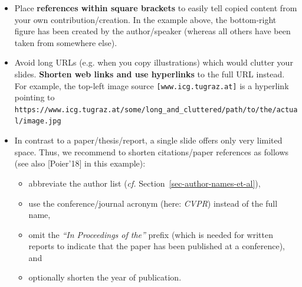 \documentclass[11pt,a4paper]{article}
\begin{document}
\begin{goodexample}
  \label{ex-slide1}
  \begin{figure}[H]
    \centering%
    {%
      \setlength{\fboxsep}{0pt}%
      \setlength{\fboxrule}{2pt}%
    }
  \end{figure}
  
  \begin{itemize}[leftmargin=6pt]
    \item Place \textbf{references within square brackets} to easily tell copied content from your own contribution/creation. In the example above, the bottom-right figure has been created by the author/speaker (whereas all others have been taken from somewhere else).
    \item Avoid long URLs (e.g. when you copy illustrations) which would clutter your slides. \textbf{Shorten web links and use hyperlinks} to the full URL instead. For example, the top-left image source {\scriptsize\texttt{[www.icg.tugraz.at]}} is a hyperlink pointing to {\scriptsize\texttt{https://www.icg.tugraz.at/some/long\_and\_cluttered/path/to/the/actual/image.jpg}}
    \item In contrast to a paper/thesis/report, a single slide offers only very limited space. Thus, we recommend to shorten citations/paper references as follows (see also {\scriptsize[Poier'18]} in this example):
    \begin{itemize}[leftmargin=12pt]
      \item abbreviate the author list (\emph{cf.} Section~\ref{sec-author-names-et-al}),
      \item use the conference/journal acronym (here: \emph{CVPR}) instead of the full name,
      \item omit the \emph{``In Proceedings of the''} prefix (which is needed for written reports to indicate that the paper has been published at a conference), and
      \item optionally shorten the year of publication.
    \end{itemize}
  \end{itemize}
\end{goodexample}
\end{document}
